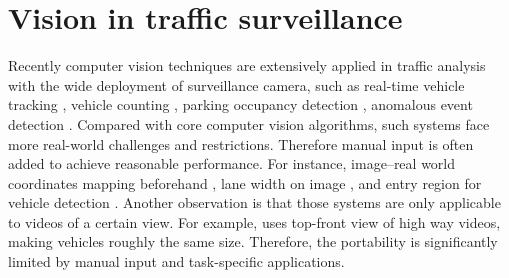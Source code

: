 \section{Vision in traffic surveillance}
Recently computer vision techniques are extensively applied in traffic analysis with the wide deployment of surveillance camera, such as real-time vehicle tracking \cite{coifman1998real}, vehicle counting \cite{wang2015real}, 
parking occupancy detection \cite{bulan2013video}, anomalous event detection \cite{jiang2011anomalous}. %
Compared with core computer vision algorithms, such systems face more real-world challenges and restrictions. Therefore manual input is often added to achieve reasonable performance. For instance,  image--real world coordinates mapping beforehand \cite{coifman1998real}, lane width on image \cite{chen2011real}, and entry region for vehicle detection \cite{chen2011real}. %
Another observation is that those systems are only applicable to videos of a certain view.  
For example, \cite{coifman1998real}
uses top-front view of high way videos, making vehicles roughly the same size. 
Therefore, the portability is significantly limited by manual input and task-specific applications.

